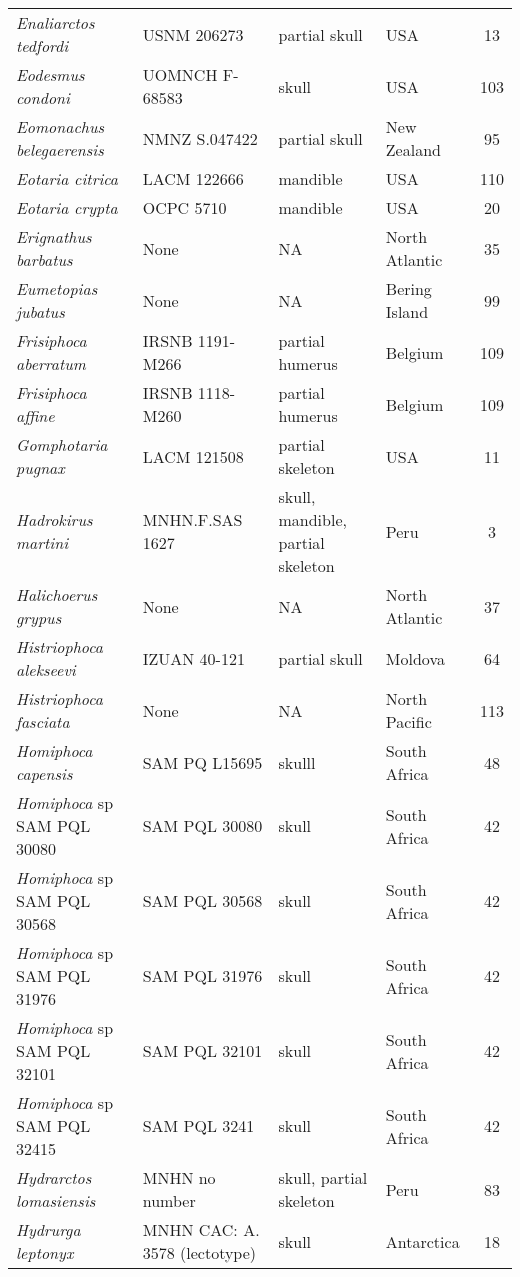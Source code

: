 \begin{longtable}{p{}p{}p{}lc}
\textit{Enaliarctos tedfordi} &	USNM 206273 & 	partial skull & 	USA & 13\\
\textit{Eodesmus condoni} &	UOMNCH F-68583 & 	skull & 	USA & 103\\
\textit{Eomonachus belegaerensis} &	NMNZ S.047422 & 	partial skull & 	New Zealand & 95\\
\textit{Eotaria citrica} &	LACM 122666 & 	mandible & 	USA & 110\\
\textit{Eotaria crypta} &	OCPC 5710 & 	mandible & 	USA & 20\\
\textit{Erignathus barbatus} &	None & 	NA & 	North Atlantic & 35\\
\textit{Eumetopias jubatus} &	None & 	NA & 	Bering Island & 99\\
\textit{Frisiphoca aberratum} &	IRSNB 1191-M266 & 	partial humerus & 	Belgium & 109\\
\textit{Frisiphoca affine} &	IRSNB 1118-M260 & 	partial humerus & 	Belgium & 109\\
\textit{Gomphotaria pugnax} &	LACM 121508 & 	partial skeleton & 	USA & 11\\
\textit{Hadrokirus martini} &	MNHN.F.SAS 1627 & 	skull, mandible, partial skeleton & 	Peru & 3\\
\textit{Halichoerus grypus} &	None & 	NA & 	North Atlantic & 37\\
\textit{Histriophoca alekseevi} & IZUAN 40-121	& partial skull	& Moldova & 64\\
\textit{Histriophoca fasciata} &	None & 	NA & 	North Pacific & 113\\
\textit{Homiphoca capensis} &	SAM PQ L15695 & 	skulll & 	South Africa & 48\\
\textit{Homiphoca} sp SAM PQL 30080	& SAM PQL 30080 & 	skull & 	South Africa & 42\\
\textit{Homiphoca} sp SAM PQL 30568	& SAM PQL 30568 & 	skull & 	South Africa & 42\\
\textit{Homiphoca} sp SAM PQL 31976	& SAM PQL 31976 & 	skull & 	South Africa & 42\\
\textit{Homiphoca} sp SAM PQL 32101	& SAM PQL 32101 & 	skull & 	South Africa & 42\\
\textit{Homiphoca} sp SAM PQL 32415	& SAM PQL 3241 & 	  skull & 	South Africa & 42\\
\textit{Hydrarctos lomasiensis} &	MNHN no number & 	skull, partial skeleton & 	Peru & 83\\
\textit{Hydrurga leptonyx} &	MNHN CAC: A. 3578 (lectotype) & 	skull & 	Antarctica & 18\\

\end{longtable}
